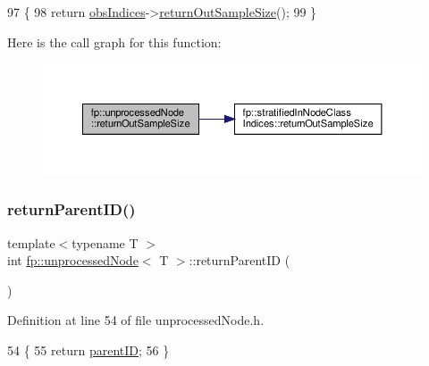 \begin{DoxyCode}
97                                                 \{
98                     \textcolor{keywordflow}{return} \hyperlink{classfp_1_1unprocessedNode_aea171244695a3a099061188a9553e525}{obsIndices}->\hyperlink{classfp_1_1stratifiedInNodeClassIndices_a6630b77af340d2023d88bafa87b94cae}{returnOutSampleSize}();
99                 \}
\end{DoxyCode}
Here is the call graph for this function\+:\nopagebreak
\begin{figure}[H]
\begin{center}
\leavevmode
\includegraphics[width=350pt]{classfp_1_1unprocessedNode_a0ebfd763233eeb60b9ee6a803e2dc917_cgraph}
\end{center}
\end{figure}
\mbox{\label{classfp_1_1unprocessedNode_aba68d6444ff034f7c43acaf3eeda9520}} 
\subsubsection{\texorpdfstring{return\+Parent\+I\+D()}{returnParentID()}}
{\footnotesize\ttfamily template$<$typename T $>$ \\
int \hyperlink{classfp_1_1unprocessedNode}{fp\+::unprocessed\+Node}$<$ T $>$\+::return\+Parent\+ID (\begin{DoxyParamCaption}{ }\end{DoxyParamCaption})\hspace{0.3cm}{\ttfamily [inline]}}



Definition at line 54 of file unprocessed\+Node.\+h.


\begin{DoxyCode}
54                                            \{
55                     \textcolor{keywordflow}{return} \hyperlink{classfp_1_1unprocessedNode_a74cb75f76c24622444e531a583b75c3d}{parentID};
56                 \}
\end{DoxyCode}
\mbox{\label{classfp_1_1unprocessedNode_a41d3bd481930201d6fc481876fd84175}} 
